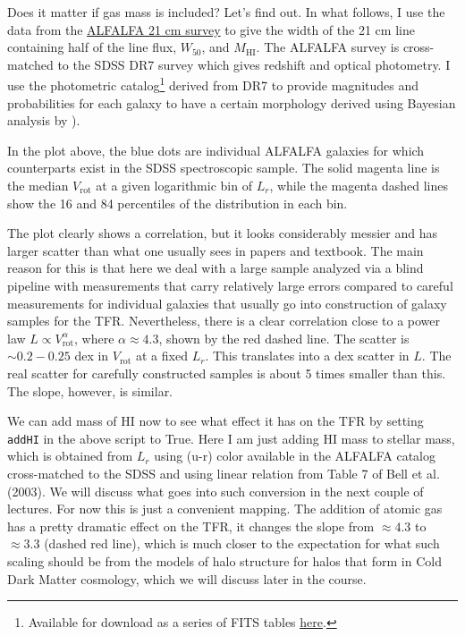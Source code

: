 Does it matter if gas mass is included? Let's find out. In what follows, I use the data from the \href{http://egg.astro.cornell.edu/alfalfa/}{ALFALFA 21 cm survey} to give the width of the 21 cm line containing half of the line flux, $W_{50}$, and $M_{\mathrm{HI}}$. The ALFALFA survey is cross-matched to the SDSS DR7 survey which gives redshift and optical photometry. I use the \href{http://adsabs.harvard.edu/abs/2015MNRAS.446.3943M}{\citet{meert_etal15}} photometric catalog\footnote{Available for download as a series of FITS tables \href{http://shalaowai.physics.upenn.edu/~ameert/fit_catalog/download/}{\underline{here}}.} derived from DR7 to provide magnitudes and probabilities for each galaxy to have a certain morphology derived using Bayesian analysis by \href{http://adsabs.harvard.edu/abs/2011A%26A...525A.157H}{\citealt{huertas_company_etal11}}).   

In the plot above, the blue dots are individual ALFALFA galaxies for which counterparts exist in the SDSS spectroscopic sample. The solid magenta line is the median $V_{\mathrm{rot}}$ at a given logarithmic bin of $L_r$, while the magenta dashed lines show the 16 and 84 percentiles of the distribution in each bin. 

The plot clearly shows a correlation, but it looks considerably messier and has larger scatter than what one usually sees in papers and textbook. The main reason for this is that here we deal with a large sample analyzed via a blind pipeline with measurements that carry relatively large errors compared to careful measurements for individual galaxies that usually go into construction of galaxy samples for the TFR. Nevertheless, there is a clear correlation close to a power law $L\propto V_{\mathrm{rot}}^{\alpha}$, where $\alpha\approx 4.3$, shown by the red dashed line. The scatter is $\sim 0.2-0.25$ dex in $V_{\mathrm{rot}}$ at a fixed $L_r$. This translates into a dex scatter in $L$. 
The real scatter for carefully constructed samples is about 5 times smaller than this. The slope, however, is similar. 

We can add mass of HI now to see what effect it has on the TFR by setting {\tt addHI} in the above script to True. Here I am just adding HI mass to stellar mass, which is obtained from $L_r$ using (u-r) color available in the ALFALFA catalog cross-matched to the SDSS and using linear relation from Table 7 of Bell et al. (2003). 
We will discuss what goes into such conversion in the next couple of lectures. For now this is just a convenient mapping. The addition of atomic gas has a pretty dramatic effect on the TFR, it changes the slope from $\approx 4.3$ to $\approx 3.3$ (dashed red line), which is much closer to the expectation for what such scaling should be from the models of halo structure for halos that form in Cold Dark Matter cosmology, which we will discuss later in the course.

